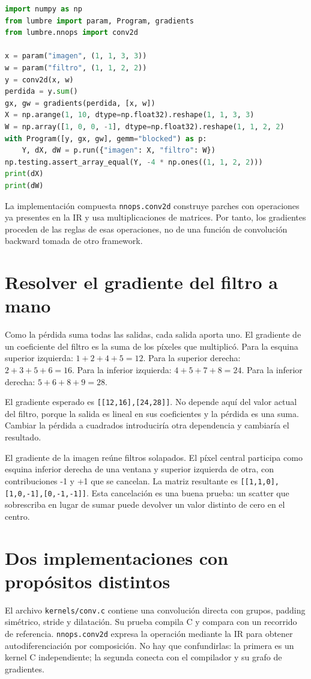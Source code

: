 \documentclass[12pt,a4paper,oneside]{report}
\begin{document}
\begin{lstlisting}[language=Python]
import numpy as np
from lumbre import param, Program, gradients
from lumbre.nnops import conv2d

x = param("imagen", (1, 1, 3, 3))
w = param("filtro", (1, 1, 2, 2))
y = conv2d(x, w)
perdida = y.sum()
gx, gw = gradients(perdida, [x, w])
X = np.arange(1, 10, dtype=np.float32).reshape(1, 1, 3, 3)
W = np.array([1, 0, 0, -1], dtype=np.float32).reshape(1, 1, 2, 2)
with Program([y, gx, gw], gemm="blocked") as p:
    Y, dX, dW = p.run({"imagen": X, "filtro": W})
np.testing.assert_array_equal(Y, -4 * np.ones((1, 1, 2, 2)))
print(dX)
print(dW)
\end{lstlisting}
La implementación compuesta \texttt{nnops.conv2d} construye parches con operaciones ya presentes en la IR y usa multiplicaciones de matrices. Por tanto, los gradientes proceden de las reglas de esas operaciones, no de una función de convolución backward tomada de otro framework.

\section{Resolver el gradiente del filtro a mano}
Como la pérdida suma todas las salidas, cada salida aporta uno. El gradiente de un coeficiente del filtro es la suma de los píxeles que multiplicó. Para la esquina superior izquierda: $1+2+4+5=12$. Para la superior derecha: $2+3+5+6=16$. Para la inferior izquierda: $4+5+7+8=24$. Para la inferior derecha: $5+6+8+9=28$.

El gradiente esperado es \texttt{[[12,16],[24,28]]}. No depende aquí del valor actual del filtro, porque la salida es lineal en sus coeficientes y la pérdida es una suma. Cambiar la pérdida a cuadrados introduciría otra dependencia y cambiaría el resultado.

El gradiente de la imagen reúne filtros solapados. El píxel central participa como esquina inferior derecha de una ventana y superior izquierda de otra, con contribuciones -1 y +1 que se cancelan. La matriz resultante es \texttt{[[1,1,0],[1,\allowbreak{}0,-1],[0,-1,\allowbreak{}-1]]}. Esta cancelación es una buena prueba: un scatter que sobrescriba en lugar de sumar puede devolver un valor distinto de cero en el centro.

\section{Dos implementaciones con propósitos distintos}
El archivo \texttt{kernels/conv.c} contiene una convolución directa con grupos, padding simétrico, stride y dilatación. Su prueba compila C y compara con un recorrido de referencia. \texttt{nnops.conv2d} expresa la operación mediante la IR para obtener autodiferenciación por composición. No hay que confundirlas: la primera es un kernel C independiente; la segunda conecta con el compilador y su grafo de gradientes.
\end{document}
